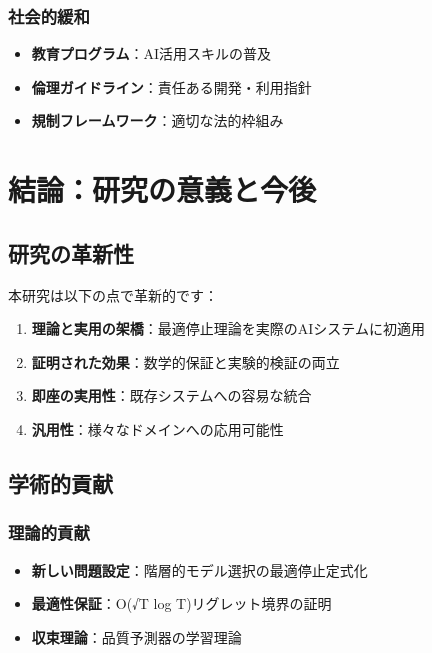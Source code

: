\documentclass[a4paper,12pt]{jsarticle}
\begin{document}
\subsubsection{社会的緩和}

\begin{itemize}
\item \textbf{教育プログラム}：AI活用スキルの普及
\item \textbf{倫理ガイドライン}：責任ある開発・利用指針
\item \textbf{規制フレームワーク}：適切な法的枠組み
\end{itemize}

\section{結論：研究の意義と今後}

\subsection{研究の革新性}

本研究は以下の点で革新的です：

\begin{enumerate}
\item \textbf{理論と実用の架橋}：最適停止理論を実際のAIシステムに初適用
\item \textbf{証明された効果}：数学的保証と実験的検証の両立
\item \textbf{即座の実用性}：既存システムへの容易な統合
\item \textbf{汎用性}：様々なドメインへの応用可能性
\end{enumerate}

\subsection{学術的貢献}

\subsubsection{理論的貢献}

\begin{itemize}
\item \textbf{新しい問題設定}：階層的モデル選択の最適停止定式化
\item \textbf{最適性保証}：O(√T log T)リグレット境界の証明
\item \textbf{収束理論}：品質予測器の学習理論
\end{itemize}
\end{document}
